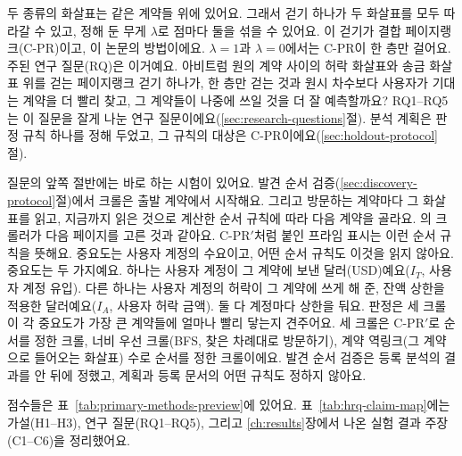 두 종류의 화살표는 같은 계약들 위에 있어요. 그래서 걷기 하나가 두 화살표를 모두 따라갈 수 있고, 정해 둔 무게 $\lambda$로 점마다 둘을 섞을 수 있어요. 이 걷기가 결합 페이지랭크(\mbox{C-PR})이고, 이 논문의 방법이에요. $\lambda=1$과 $\lambda=0$에서는 \mbox{C-PR}이 한 층만 걸어요. 주된 연구 질문(RQ)은 이거예요. 아비트럼 원의 계약 사이의 허락 화살표와 송금 화살표 위를 걷는 페이지랭크 걷기 하나가, 한 층만 걷는 것과 원시 차수보다 사용자가 기대는 계약을 더 빨리 찾고, 그 계약들이 나중에 쓰일 것을 더 잘 예측할까요? RQ1--RQ5는 이 질문을 잘게 나눈 연구 질문이에요(\ref{sec:research-questions}절). 분석 계획은 판정 규칙 하나를 정해 두었고, 그 규칙의 대상은 \mbox{C-PR}이에요(\ref{sec:holdout-protocol}절).

질문의 앞쪽 절반에는 바로 하는 시험이 있어요. 발견 순서 검증(\ref{sec:discovery-protocol}절)에서 크롤은 출발 계약에서 시작해요. 그리고 방문하는 계약마다 그 화살표를 읽고, 지금까지 읽은 것으로 계산한 순서 규칙에 따라 다음 계약을 골라요. \textcite{cho1998crawling}의 크롤러가 다음 페이지를 고른 것과 같아요. \mbox{C-PR}$'$처럼 붙인 프라임 표시는 이런 순서 규칙을 뜻해요. 중요도는 사용자 계정의 수요이고, 어떤 순서 규칙도 이것을 읽지 않아요. 중요도는 두 가지예요. 하나는 사용자 계정이 그 계약에 보낸 달러(USD)예요($I_T$, 사용자 계정 유입). 다른 하나는 사용자 계정의 허락이 그 계약에 쓰게 해 준, 잔액 상한을 적용한 달러예요($I_A$, 사용자 허락 금액). 둘 다 계정마다 상한을 둬요. 판정은 세 크롤이 각 중요도가 가장 큰 계약들에 얼마나 빨리 닿는지 견주어요. 세 크롤은 \mbox{C-PR}$'$로 순서를 정한 크롤, 너비 우선 크롤(BFS, 찾은 차례대로 방문하기), 계약 역링크(그 계약으로 들어오는 화살표) 수로 순서를 정한 크롤이에요. 발견 순서 검증은 등록 분석의 결과를 안 뒤에 정했고, 계획과 등록 문서의 어떤 규칙도 정하지 않아요.

점수들은 표~\ref{tab:primary-methods-preview}에 있어요. 표~\ref{tab:hrq-claim-map}에는 가설(H1--H3), 연구 질문(RQ1--RQ5), 그리고 \ref{ch:results}장에서 나온 실험 결과 주장(C1--C6)을 정리했어요.

